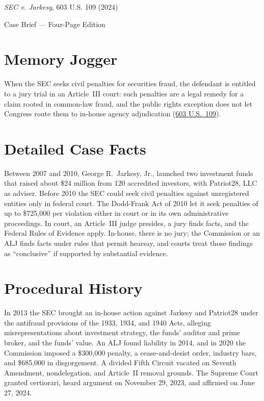 \documentclass[12pt]{article}
\begin{document}
\begin{center}
{\LARGE \textit{SEC v. Jarkesy}, 603 U.S. 109 (2024)\par}
\vspace{0.8em}
{\large Case Brief --- Four-Page Edition\par}
\end{center}
\vspace{1em}

\section{Memory Jogger}

When the SEC seeks civil penalties for securities fraud, the defendant is entitled to a jury trial in an Article~III court: such penalties are a legal remedy for a claim rooted in common-law fraud, and the public rights exception does not let Congress route them to in-house agency adjudication (\href{https://supreme.justia.com/cases/federal/us/603/22-859/}{603 U.S.\ 109}).

\section{Detailed Case Facts}

Between 2007 and 2010, George R.\ Jarkesy, Jr., launched two investment funds that raised about \$24 million from 120 accredited investors, with Patriot28, LLC as adviser. Before 2010 the SEC could seek civil penalties against unregistered entities only in federal court. The Dodd-Frank Act of 2010 let it seek penalties of up to \$725,000 per violation either in court or in its own administrative proceedings. In court, an Article~III judge presides, a jury finds facts, and the Federal Rules of Evidence apply. In-house, there is no jury; the Commission or an ALJ finds facts under rules that permit hearsay, and courts treat those findings as ``conclusive'' if supported by substantial evidence.

\section{Procedural History}

In 2013 the SEC brought an in-house action against Jarkesy and Patriot28 under the antifraud provisions of the 1933, 1934, and 1940 Acts, alleging misrepresentations about investment strategy, the funds' auditor and prime broker, and the funds' value. An ALJ found liability in 2014, and in 2020 the Commission imposed a \$300,000 penalty, a cease-and-desist order, industry bars, and \$685,000 in disgorgement. A divided Fifth Circuit vacated on Seventh Amendment, nondelegation, and Article~II removal grounds. The Supreme Court granted certiorari, heard argument on November 29, 2023, and affirmed on June 27, 2024.
\end{document}
